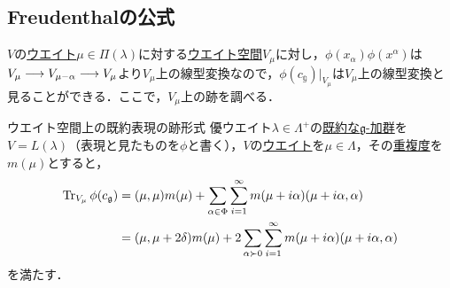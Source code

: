 \documentclass[rep_main]{subfiles}
\begin{document}
\subsection{Freudenthalの公式}
$V$の\hyperref[def:weight-rep]{ウエイト}$\mu \in \Pi(\lambda)$に対する\hyperref[def:weight-rep]{ウエイト空間}$V_\mu$に対し，$\phi(x_\alpha)\phi(x^\alpha)$は$V_\mu \longrightarrow V_{\mu - \alpha} \longrightarrow V_\mu$より$V_\mu$上の線型変換なので，$\phi(c_\mathbb{g})|_{V_\mu}$は$V_\mu$上の線型変換と見ることができる．ここで，$V_\mu$上の跡を調べる．
\begin{mylem}[label=lem:Freudenthal]{ウエイト空間上の既約表現の跡形式}
	優ウエイト$\lambda \in \Lambda^+$の\hyperref[thm:hwmodule-exist]{既約な$\mathfrak{g}$-加群}を$V = L(\lambda)$（表現と見たものを$\phi$と書く），$V$の\hyperref[def:weight-rep]{ウエイト}を$\mu \in \Lambda$，その\hyperref[def:mutiplicity]{重複度}を$m(\mu)$とすると，
	\begin{align}
		\Tr_{V_\mu} \phi(c_\mathfrak{g}) &= (\mu, \mu)m(\mu) + \sum_{\alpha \in \Phi} \sum_{i=1}^\infty m(\mu + i\alpha)(\mu + i\alpha, \alpha) \\
		&= (\mu, \mu + 2\delta)m(\mu) + 2\sum_{\alpha \succ 0} \sum_{i=1}^\infty m(\mu + i\alpha)(\mu + i\alpha, \alpha)
	\end{align}
	を満たす．
\end{mylem}
\end{document}
